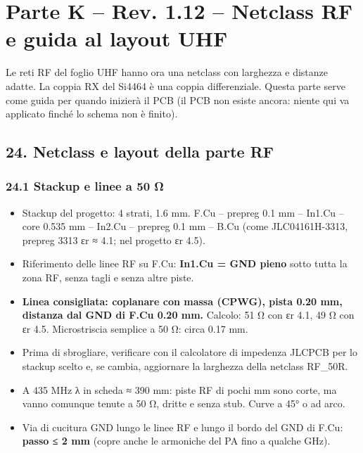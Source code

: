 \clearpage
\section[Parte K – Rev. 1.12 – Netclass RF e guida al layout UHF]{Parte K – Rev. 1.12 – Netclass RF e guida al layout UHF}

Le reti RF del foglio UHF hanno ora una netclass con larghezza e distanze adatte. La coppia RX del Si4464 è una coppia differenziale. Questa parte serve come guida per quando inizierà il PCB (il PCB non esiste ancora: niente qui va applicato finché lo schema non è finito).

\subsection[24. Netclass e layout della parte RF]{24. Netclass e layout della parte RF }

\subsubsection[24.1 Stackup e linee a 50 Ω]{24.1 Stackup e linee a 50 Ω}

\begin{itemize}
\item Stackup del progetto: 4 strati, 1.6 mm. F.Cu – prepreg 0.1 mm – In1.Cu – core 0.535 mm – In2.Cu – prepreg 0.1 mm – B.Cu (come JLC04161H-3313, prepreg 3313 εr ≈ 4.1; nel progetto εr 4.5).
\item Riferimento delle linee RF su F.Cu: \textbf{In1.Cu = GND pieno} sotto tutta la zona RF, senza tagli e senza altre piste.
\item \textbf{Linea consigliata: coplanare con massa (CPWG), pista 0.20 mm, distanza dal GND di F.Cu 0.20 mm.} Calcolo: 51 Ω con εr 4.1, 49 Ω con εr 4.5. Microstriscia semplice a 50 Ω: circa 0.17 mm.
\item Prima di sbrogliare, verificare con il calcolatore di impedenza JLCPCB per lo stackup scelto e, se cambia, aggiornare la larghezza della netclass RF\_\allowbreak{}50R.
\item A 435 MHz λ in scheda ≈ 390 mm: piste RF di pochi mm sono corte, ma vanno comunque tenute a 50 Ω, dritte e senza stub. Curve a 45° o ad arco.
\item Via di cucitura GND lungo le linee RF e lungo il bordo del GND di F.Cu: \textbf{passo ≤ 2 mm} (copre anche le armoniche del PA fino a qualche GHz).
\end{itemize}

